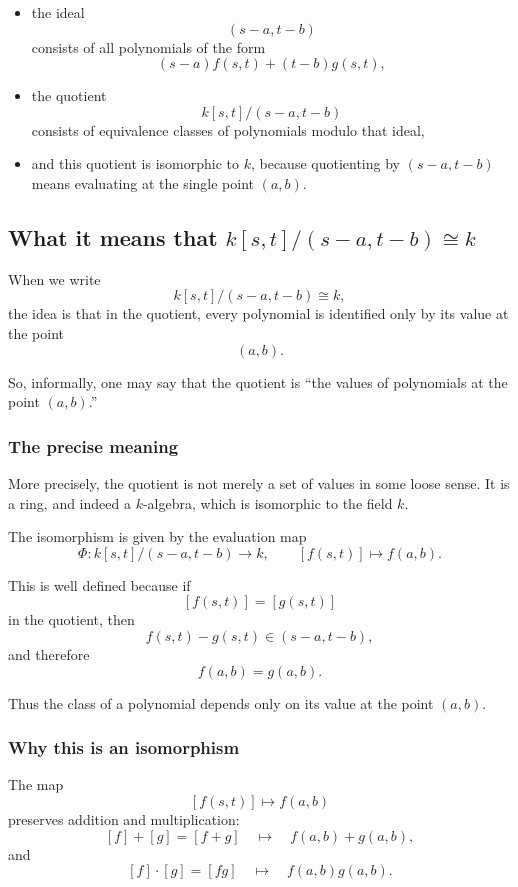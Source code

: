 \documentclass[12pt,a4paper]{article}
\theoremstyle{notespace}
\theoremstyle{definition}
\begin{document}
\begin{itemize}
	\item the ideal
	\[
	(s-a,t-b)
	\]
	consists of all polynomials of the form
	\[
	(s-a)f(s,t)+(t-b)g(s,t),
	\]
	
	\item the quotient
	\[
	k[s,t]/(s-a,t-b)
	\]
	consists of equivalence classes of polynomials modulo that ideal,
	
	\item and this quotient is isomorphic to \(k\), because quotienting by \((s-a,t-b)\) means evaluating at the single point \((a,b)\).
\end{itemize}

\subsection{What it means that \(k[s,t]/(s-a,t-b)\cong k\)}

When we write
\[
k[s,t]/(s-a,t-b)\cong k,
\]
the idea is that in the quotient, every polynomial is identified only by its value at the point
\[
(a,b).
\]

So, informally, one may say that the quotient is ``the values of polynomials at the point \((a,b)\).''

\subsubsection{The precise meaning}

More precisely, the quotient is not merely a set of values in some loose sense.  
It is a ring, and indeed a \(k\)-algebra, which is isomorphic to the field \(k\).

The isomorphism is given by the evaluation map
\[
\Phi: k[s,t]/(s-a,t-b)\longrightarrow k,
\qquad
[f(s,t)]\longmapsto f(a,b).
\]

This is well defined because if
\[
[f(s,t)]=[g(s,t)]
\]
in the quotient, then
\[
f(s,t)-g(s,t)\in (s-a,t-b),
\]
and therefore
\[
f(a,b)=g(a,b).
\]

Thus the class of a polynomial depends only on its value at the point \((a,b)\).

\subsubsection{Why this is an isomorphism}

The map
\[
[f(s,t)]\mapsto f(a,b)
\]
preserves addition and multiplication:
\[
[f]+[g]=[f+g]
\quad\mapsto\quad
f(a,b)+g(a,b),
\]
and
\[
[f]\cdot[g]=[fg]
\quad\mapsto\quad
f(a,b)g(a,b).
\]
\end{document}
